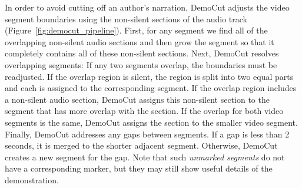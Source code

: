 In order to avoid cutting off an author's narration, DemoCut
adjusts the video segment boundaries using the non-silent sections
of the audio track (Figure~\ref{fig:democut_pipeline}). First, for any segment
we find
all of the overlapping non-silent audio sections and then grow the
segment so that it completely contains all of these non-silent sections.
%
Next, DemoCut resolves overlapping segments: If any two segments
overlap,
the boundaries must be readjusted.
%
If the overlap region is silent, the region is split into two equal parts and each is assigned to the
corresponding segment.
%
If the overlap region includes a non-silent audio section,
DemoCut assigns this non-silent section to the segment that has
more overlap with the section. If the overlap for both video segments is the same, DemoCut assigns the section to the smaller video segment.
%
Finally, DemoCut addresses any gaps between segments. If a gap is less
than 2 seconds, it is merged to the shorter adjacent segment.
Otherwise, DemoCut creates a new segment for the gap. Note
that such {\em unmarked segments} do not have a corresponding marker, but
they may still show useful details of the demonstration.


%


